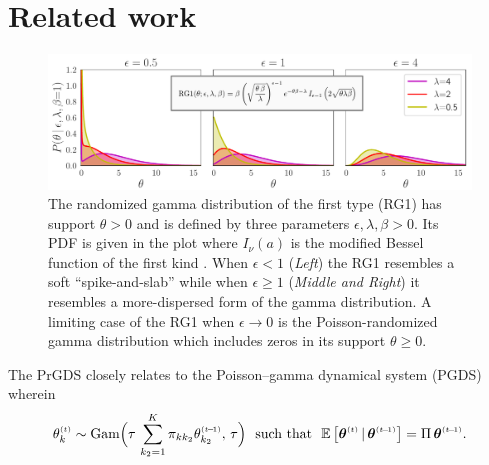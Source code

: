 \documentclass{article}
\begin{document}
\section{Related work}
\label{sec:bg}
\begin{figure}[t]
\centering
\includegraphics[width=\linewidth]{../../fig/distributions/annotated_rg1.pdf}
\caption{\footnotesize \label{fig:rg1} The randomized gamma distribution of the first type (RG1) \cite{yuan2000bessel,makarov2010exact} has support $\theta \!>\!  0$ and is defined by three parameters $\epsilon,\lambda,\beta \!>\! 0$. Its PDF is given in the plot where $I_{\nu}(a)$ is the modified Bessel function of the first kind \cite{abramowitz1965handbook}. When $\epsilon < 1$ (\emph{Left}) the RG1 resembles a soft ``spike-and-slab'' while when $\epsilon \geq 1$ (\emph{Middle and Right}) it resembles a more-dispersed form of the gamma distribution. A limiting case of the RG1 when $\epsilon \!\rightarrow\! 0$ is the Poisson-randomized gamma distribution \cite{zhou2016augmentable} which includes zeros in its support $\theta \geq 0$.~}\vspace{-0.5em}
\end{figure}
The PrGDS closely relates to the Poisson--gamma dynamical system (PGDS)~\citep{schein2016poisson} wherein~\vspace{-0.2em}
\begin{equation}
\label{eq:pgds}
\thetakt \sim \textrm{Gam}\Big(\tau\,\sum_{k_2=1}^K \pi_{kk_2} \thetakttm,\, \tau\Big)\,\,\textrm{ such that }\,\,
% 
\mathbb{E}\left[\boldsymbol{\theta}^{\mathsmaller{(t)}} \given \boldsymbol{\theta}^{\mathsmaller{(t \tm 1)}}\right]= \Pi \, \boldsymbol{\theta}^{\mathsmaller{(t \tm 1)}}.
\end{equation}\vspace{-0.2em}
\end{document}
